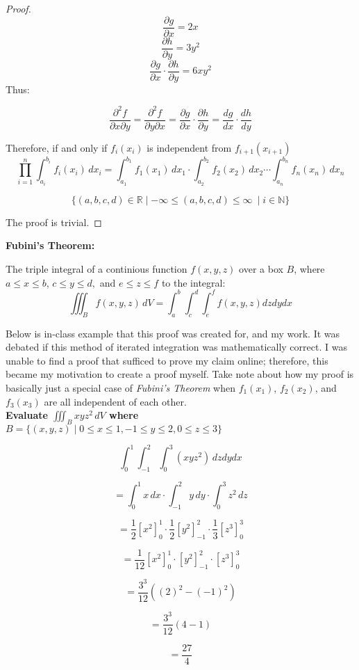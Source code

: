 \documentclass{article}
\begin{document}
\begin{proof}
\[\frac{\partial g}{\partial x} = 2x\]
\[\frac{\partial h}{\partial y} = 3y^{2}\]
\[\frac{\partial g}{\partial x} \cdot \frac{\partial h}{\partial y} = 6xy^{2}\]
Thus:

\[
    \frac{\partial^2 f}{\partial x \partial y} = \frac{\partial^2 f}{\partial y \partial x} = \frac{\partial g}{\partial x} \cdot \frac{\partial h}{\partial y} = \frac{dg}{dx} \cdot \frac{dh}{dy}
\]

Therefore, if and only if $f_i(x_i)$ is independent from $f_{i+1}(x_{i+1})$
\[
\prod_{i=1}^n \int_{a_i}^{b_i} f_i(x_i) \, dx_i = \int_{a_1}^{b_1} f_1(x_1) \, dx_1 \cdot \int_{a_2}^{b_2} f_2(x_2) \, dx_2 \cdots \int_{a_n}^{b_n} f_n(x_n) \, dx_n
\]

\[
    \{(a, b, c, d) \in \mathbb{R} \mid - \infty \le (a, b, c, d) \le \infty \ \mid i \in \mathbb{N}\}
\]

The proof is trivial.

\end{proof}

\newpage

\textbf{Fubini's Theorem:}

The triple integral of a continious function \( f(x, y, z) \) over a box \( B \), where $a \leq x \leq b$, $c \leq y \leq d,$ and $e \leq z \leq f$ to the integral:
\[
    \iiint_B f(x, y, z) \, dV = \int_{a}^{b} \int_{c}^{d} \int_{e}^{f}f(x,y,z)dzdydx
\]

Below is in-class example that this proof was created for, and my work. It was debated if this method of iterated integration was mathematically correct.
I was unable to find a proof that sufficed to prove my claim online; therefore, this became my motivation to create a proof myself.
Take note about how my proof is basically just a special case of \textit{Fubini's Theorem} when  $f_1(x_1)$, $f_{2}(x_{2})$, and $f_{3}(x_{3})$ are all independent of each other.\\

\textbf{Evaluate $\iiint_B xyz^{2} \, dV$ where $ B = \{(x,y,z) \mid  0 \leq x \leq 1, -1 \leq y \leq 2, 0 \leq z \leq 3\}$}

\[
    \int_{0}^{1} \int_{-1}^{2} \int_{0}^{3}(xyz^{2}) \, dzdydx
\]

\[
    = \int_{0}^{1}x \, dx \cdot \int_{-1}^{2}y \, dy \cdot \int_{0}^{3}z^{2} \, dz
\]

\[
    = \frac{1}{2}[x^{2}]_{0}^{1} \cdot \frac{1}{2}[y^{2}]_{-1}^{2} \cdot \frac{1}{3}[z^{3}]_{0}^{3}
\]

\[
    = \frac{1}{12}[x^{2}]_{0}^{1} \cdot [y^{2}]_{-1}^{2} \cdot [z^{3}]_{0}^{3}
\]

\[
    = \frac{3^{3}}{12}((2)^{2}-(-1)^{2})
\]

\[
    = \frac{3^{3}}{12}(4-1)
\]


\[
    = \frac{27}{4}
\] 
\end{document}
